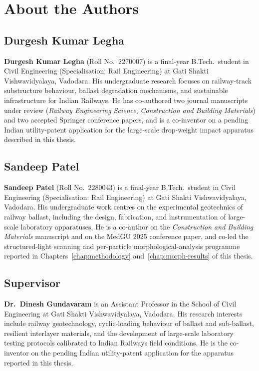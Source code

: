 \cleardoublepage
\chapter*{About the Authors}
\thispagestyle{plain}

\section*{\textcolor{gsvblue}{Durgesh Kumar Legha}}
\noindent
\textbf{Durgesh Kumar Legha} (Roll No.\ 2270007) is a final-year
B.Tech.\ student in Civil Engineering (Specialisation: Rail
Engineering) at Gati Shakti Vishwavidyalaya, Vadodara. His
undergraduate research focuses on railway-track substructure
behaviour, ballast degradation mechanisms, and sustainable
infrastructure for Indian Railways. He has co-authored two journal
manuscripts under review (\textit{Railway Engineering Science},
\textit{Construction and Building Materials}) and two accepted
Springer conference papers, and is a co-inventor on a pending Indian
utility-patent application for the large-scale drop-weight impact
apparatus described in this thesis.

\vspace{0.6cm}

\section*{\textcolor{gsvblue}{Sandeep Patel}}
\noindent
\textbf{Sandeep Patel} (Roll No.\ 2280043) is a final-year B.Tech.\
student in Civil Engineering (Specialisation: Rail Engineering) at
Gati Shakti Vishwavidyalaya, Vadodara. His undergraduate work
centres on the experimental geotechnics of railway ballast, including
the design, fabrication, and instrumentation of large-scale
laboratory apparatuses. He is a co-author on the
\textit{Construction and Building Materials} manuscript and on the
MedGU 2025 conference paper, and co-led the structured-light scanning
and per-particle morphological-analysis programme reported in
Chapters~\ref{chap:methodology} and~\ref{chap:morph-results} of this
thesis.

\vspace{1.0cm}
\section*{\textcolor{gsvblue}{Supervisor}}
\noindent
\textbf{Dr.\ Dinesh Gundavaram} is an Assistant Professor in the
School of Civil Engineering at Gati Shakti Vishwavidyalaya, Vadodara.
His research interests include railway geotechnology, cyclic-loading
behaviour of ballast and sub-ballast, resilient interlayer materials,
and the development of large-scale laboratory testing protocols
calibrated to Indian Railways field conditions. He is the
co-inventor on the pending Indian utility-patent application for the
apparatus reported in this thesis.

